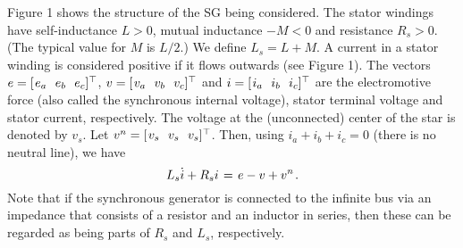 \documentclass[12pt]{article}
\theoremstyle{definition}
\numberwithin{equation}{section}                        %
\newcommand{\BE}{\begin{equation}}
\newcommand{\BEQ}[1]{\BE\mathlabel{#1}} %
\newcommand{\m}      {{\hbox{\hskip 1pt}}}
\let\oldlabel=\label
\renewcommand{\label}[1]{\leavevmode\smash{\raise 10pt\llap
             {\fbox{\scriptsize#1}}}\oldlabel{#1}}
\newcommand{\mathlabel}[1]{\smash{\raise 9pt\llap
             {\scriptsize(#1)}}\label{#1}}
\renewcommand{\label}[1]{\oldlabel{#1}}
\renewcommand{\mathlabel}[1]{\label{#1}}
\begin{document}
Figure 1 shows the structure of the SG being considered. The stator
windings have self-inductance $L>0$, mutual inductance $-M<0$ and
resistance $R_s>0$. (The typical value for $M$ is $L/2$.) We define
$L_s=L+M$. A current in a stator winding is considered positive if
it flows outwards (see Figure 1). The vectors $e=[\m e_a\ \ e_b\ \
e_c]^\top$, $v=[\m v_a\ \ v_b\ \ v_c]^\top$ and $i=[\m i_a\ \ i_b\ \
i_c]^\top$ are the electromotive force (also called the synchronous
internal voltage), stator terminal voltage and stator current,
respectively. The voltage at the (unconnected) center of the star is
denoted by $v_s$. Let $v^n=[\m v_s\ \ v_s\ \ v_s]^\top$. Then, using
$i_a+i_b+i_c=0$ (there is no neutral line), we have \vspace{-2.5mm}
\BEQ{voltam_Savtanal}
   L_s \dot i+R_s i \m=\m e-v+v^n \m. \vspace{-1mm}
\end{equation}
Note that if the synchronous generator is connected to the infinite
bus via an impedance that consists of a resistor and an inductor in
series, then these can be regarded as being parts of $R_s$ and $L_s$,
respectively.

\end{document}
